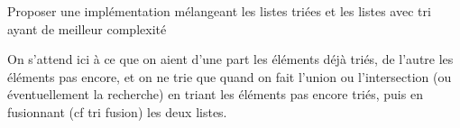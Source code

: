 \begin{exercise}
	Proposer une implémentation mélangeant les listes triées et les listes avec tri ayant de meilleur complexité
\end{exercise}

\begin{com}
	On s'attend ici à ce que on aient d'une part les éléments déjà triés, de l'autre les éléments pas encore, et on ne trie que quand on fait l'union ou l'intersection (ou éventuellement la recherche) en triant les éléments pas encore triés, puis en fusionnant (cf tri fusion) les deux listes.
\end{com}